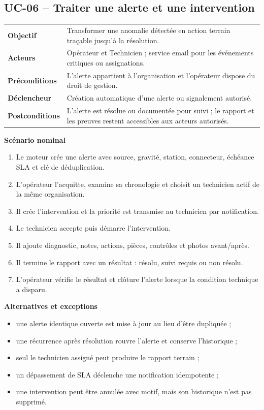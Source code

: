 \subsection{UC-06 -- Traiter une alerte et une intervention}

\begin{table}[H]
  \centering
  \begin{tabularx}{\textwidth}{@{}C{3.3cm}Y@{}}
    \toprule
    \textbf{Objectif} & Transformer une anomalie détectée en action terrain traçable
    jusqu'à la résolution.\\
    \textbf{Acteurs} & Opérateur et Technicien ; service email pour les événements
    critiques ou assignations.\\
    \textbf{Préconditions} & L'alerte appartient à l'organisation et l'opérateur
    dispose du droit de gestion.\\
    \textbf{Déclencheur} & Création automatique d'une alerte ou signalement autorisé.\\
    \textbf{Postconditions} & L'alerte est résolue ou documentée pour suivi ; le
    rapport et les preuves restent accessibles aux acteurs autorisés.\\
    \bottomrule
  \end{tabularx}
\end{table}

\textbf{Scénario nominal}
\begin{enumerate}[leftmargin=8mm]
  \item Le moteur crée une alerte avec source, gravité, station, connecteur, échéance
  SLA et clé de déduplication.
  \item L'opérateur l'acquitte, examine sa chronologie et choisit un technicien actif
  de la même organisation.
  \item Il crée l'intervention et la priorité est transmise au technicien par
  notification.
  \item Le technicien accepte puis démarre l'intervention.
  \item Il ajoute diagnostic, notes, actions, pièces, contrôles et photos avant/après.
  \item Il termine le rapport avec un résultat : résolu, suivi requis ou non résolu.
  \item L'opérateur vérifie le résultat et clôture l'alerte lorsque la condition
  technique a disparu.
\end{enumerate}

\textbf{Alternatives et exceptions}
\begin{itemize}[leftmargin=7mm]
  \item une alerte identique ouverte est mise à jour au lieu d'être dupliquée ;
  \item une récurrence après résolution rouvre l'alerte et conserve l'historique ;
  \item seul le technicien assigné peut produire le rapport terrain ;
  \item un dépassement de SLA déclenche une notification idempotente ;
  \item une intervention peut être annulée avec motif, mais son historique n'est pas
  supprimé.
\end{itemize}

